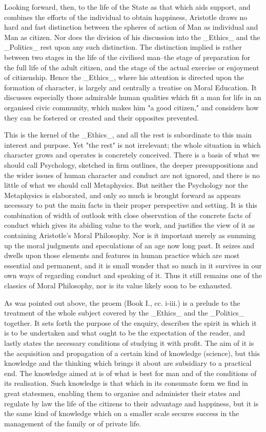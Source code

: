 Looking forward, then, to the life of the State as that which aids
support, and combines the efforts of the individual to obtain happiness,
Aristotle draws no hard and fast distinction between the spheres of
action of Man as individual and Man as citizen. Nor does the division of
his discussion into the _Ethics_ and the _Politics_ rest upon any such
distinction. The distinction implied is rather between two stages in the
life of the civilised man--the stage of preparation for the full life of
the adult citizen, and the stage of the actual exercise or enjoyment of
citizenship. Hence the _Ethics_, where his attention is directed upon
the formation of character, is largely and centrally a treatise on Moral
Education. It discusses especially those admirable human qualities which
fit a man for life in an organised civic community, which makes him "a
good citizen," and considers how they can be fostered or created and
their opposites prevented.

This is the kernel of the _Ethics_, and all the rest is subordinate to
this main interest and purpose. Yet "the rest" is not irrelevant; the
whole situation in which character grows and operates is concretely
conceived. There is a basis of what we should call Psychology, sketched
in firm outlines, the deeper presuppositions and the wider issues of
human character and conduct are not ignored, and there is no little of
what we should call Metaphysics. But neither the Psychology nor the
Metaphysics is elaborated, and only so much is brought forward as
appears necessary to put the main facts in their proper perspective
and setting. It is this combination of width of outlook with close
observation of the concrete facts of conduct which gives its abiding
value to the work, and justifies the view of it as containing
Aristotle's Moral Philosophy. Nor is it important merely as summing up
the moral judgments and speculations of an age now long past. It seizes
and dwells upon those elements and features in human practice which are
most essential and permanent, and it is small wonder that so much in it
survives in our own ways of regarding conduct and speaking of it. Thus
it still remains one of the classics of Moral Philosophy, nor is its
value likely soon to be exhausted.

As was pointed out above, the proem (Book I., cc. i-iii.) is a prelude
to the treatment of the whole subject covered by the _Ethics_ and the
_Politics_ together. It sets forth the purpose of the enquiry, describes
the spirit in which it is to be undertaken and what ought to be the
expectation of the reader, and lastly states the necessary conditions
of studying it with profit. The aim of it is the acquisition and
propagation of a certain kind of knowledge (science), but this knowledge
and the thinking which brings it about are subsidiary to a practical
end. The knowledge aimed at is of what is best for man and of the
conditions of its realisation. Such knowledge is that which in its
consumate form we find in great statesmen, enabling them to organise and
administer their states and regulate by law the life of the citizens
to their advantage and happiness, but it is the same kind of knowledge
which on a smaller scale secures success in the management of the family
or of private life.

